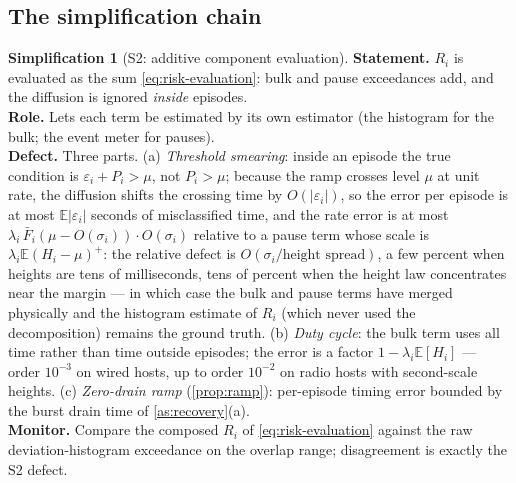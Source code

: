 \documentclass[11pt, a4paper]{article}
\theoremstyle{definition}
\newtheorem{simplification}{Simplification}
\theoremstyle{plain}
\theoremstyle{remark}
\newcommand{\E}{\mathbb{E}}
\newcommand{\pos}[1]{\left(#1\right)^{\!+}}
\begin{document}
\subsection{The simplification chain}\label{sec:simplification-chain}

\setcounter{simplification}{1}%
\begin{simplification}[S2: additive component evaluation]
\label{simp:additive}
\textbf{Statement.}  $R_i$ is evaluated as the sum
\cref{eq:risk-evaluation}: bulk and pause exceedances add, and the
diffusion is ignored \emph{inside} episodes.\\
\textbf{Role.}  Lets each term be estimated by its own estimator (the
histogram for the bulk; the event meter for pauses).\\
\textbf{Defect.}  Three parts.  (a) \emph{Threshold smearing}: inside an
episode the true condition is $\varepsilon_i + P_i > \mu$, not
$P_i > \mu$; because the ramp crosses level $\mu$ at unit rate, the
diffusion shifts the crossing time by $O(|\varepsilon_i|)$, so the error
per episode is at most $\E|\varepsilon_i|$ seconds of misclassified
time, and the rate error is at most
$\lambda_i\,\bar F_i(\mu - O(\sigma_i))\cdot O(\sigma_i)$ relative to a
pause term whose scale is $\lambda_i \E\pos{H_i-\mu}$: the relative
defect is $O(\sigma_i / \text{height spread})$, a few percent when
heights are tens of milliseconds, tens of percent when the height law
concentrates near the margin --- in which case the bulk and pause terms
have merged physically and the histogram estimate of $R_i$ (which never
used the decomposition) remains the ground truth.  (b) \emph{Duty
cycle}: the bulk term uses all time rather than time outside episodes;
the error is a factor $1 - \lambda_i\E[H_i]$ --- order $10^{-3}$ on
wired hosts, up to order $10^{-2}$ on radio hosts with second-scale
heights.  (c) \emph{Zero-drain ramp} (\cref{prop:ramp}): per-episode
timing error bounded by the burst drain time of
\cref{as:recovery}(a).\\
\textbf{Monitor.}  Compare the composed $R_i$ of
\cref{eq:risk-evaluation} against the raw deviation-histogram exceedance
on the overlap range; disagreement is exactly the S2 defect.
\end{simplification}
\end{document}
